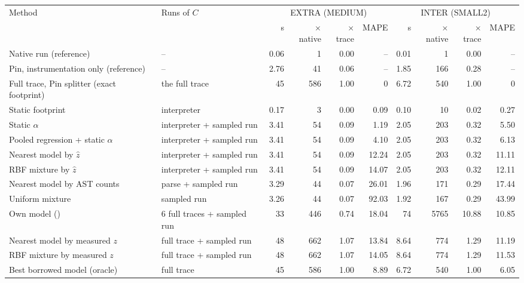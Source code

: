 \begin{tabular}{llrrrrrrrr}
\toprule
Method & Runs of $C$ & \multicolumn{4}{c}{EXTRA (MEDIUM)} & \multicolumn{4}{c}{INTER (SMALL2)} \\
\cmidrule(lr){3-6}\cmidrule(lr){7-10}
 & & s & $\times$native & $\times$trace & MAPE & s & $\times$native & $\times$trace & MAPE \\
\midrule
Native run (reference) & -- & 0.06 & 1 & 0.00 & -- & 0.01 & 1 & 0.00 & -- \\
Pin, instrumentation only (reference) & -- & 2.76 & 41 & 0.06 & -- & 1.85 & 166 & 0.28 & -- \\
Full trace, Pin splitter (exact footprint) & the full trace & 45 & 586 & 1.00 & 0 & 6.72 & 540 & 1.00 & 0 \\
\addlinespace
Static footprint & interpreter & 0.17 & 3 & 0.00 & 0.09 & 0.10 & 10 & 0.02 & 0.27 \\
Static $\alpha$ & interpreter + sampled run & 3.41 & 54 & 0.09 & 1.19 & 2.05 & 203 & 0.32 & 5.50 \\
Pooled regression + static $\alpha$ & interpreter + sampled run & 3.41 & 54 & 0.09 & 4.10 & 2.05 & 203 & 0.32 & 6.13 \\
Nearest model by $\hat z$ & interpreter + sampled run & 3.41 & 54 & 0.09 & 12.24 & 2.05 & 203 & 0.32 & 11.11 \\
RBF mixture by $\hat z$ & interpreter + sampled run & 3.41 & 54 & 0.09 & 14.07 & 2.05 & 203 & 0.32 & 12.11 \\
Nearest model by AST counts & parse + sampled run & 3.29 & 44 & 0.07 & 26.01 & 1.96 & 171 & 0.29 & 17.44 \\
Uniform mixture & sampled run & 3.26 & 44 & 0.07 & 92.03 & 1.92 & 167 & 0.29 & 43.99 \\
\addlinespace
Own model (\memprint{}) & 6 full traces + sampled run & 33 & 446 & 0.74 & 18.04 & 74 & 5765 & 10.88 & 10.85 \\
Nearest model by measured $z$ & full trace + sampled run & 48 & 662 & 1.07 & 13.84 & 8.64 & 774 & 1.29 & 11.19 \\
RBF mixture by measured $z$ & full trace + sampled run & 48 & 662 & 1.07 & 14.05 & 8.64 & 774 & 1.29 & 11.53 \\
Best borrowed model (oracle) & full trace & 45 & 586 & 1.00 & 8.89 & 6.72 & 540 & 1.00 & 6.05 \\
\bottomrule
\end{tabular}
